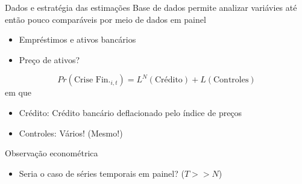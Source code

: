 \documentclass[presentation]{beamer}
\begin{document}
\begin{frame}[label={sec:orgb2058f3}]{Dados e estratégia das estimações}
Base de dados permite analizar variávies até então pouco comparáveis por meio de dados em painel

\begin{itemize}
\item Empréstimos e ativos bancários
\item Preço de ativos? \cite{jordaGreatMortgagingHousing2016}
\end{itemize}


$$
Pr(\text{Crise Fin.}_{i,t}) = L^{N}(\text{Crédito}) + L(\text{Controles})
$$
em que
\begin{itemize}
\item \alert{Crédito:} Crédito bancário deflacionado pelo índice de preços
\item \alert{Controles:} Vários! (Mesmo!)
\end{itemize}

\begin{block}{Observação econométrica}
\begin{itemize}
\item Seria o caso de séries temporais em painel? (\(T>>N\))
\end{itemize}
\end{block}
\end{frame}
\end{document}
